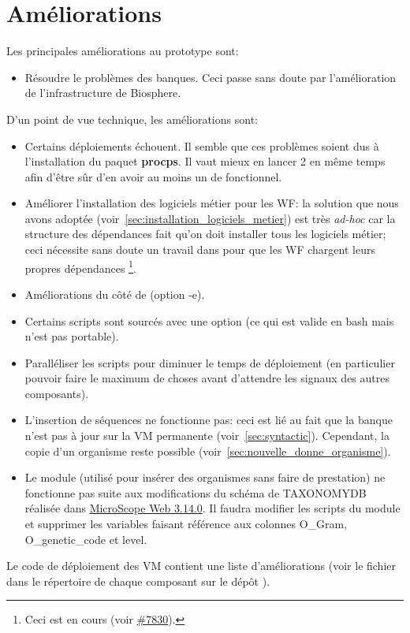 \section{Améliorations}

Les principales améliorations au prototype sont:
\begin{itemize}
    \item Résoudre le problèmes des banques.
          Ceci passe sans doute par l'amélioration de l'infrastructure de Biosphere.
\end{itemize}


D'un point de vue technique, les améliorations sont:
\begin{itemize}
    \item Certains déploiements échouent.
          Il semble que ces problèmes soient dus à l'installation du paquet \textbf{procps}.
          Il vaut mieux en lancer 2 en même temps afin d'être sûr d'en avoir au moins un de fonctionnel.
    \item Améliorer l'installation des logiciels métier pour les WF:
          la solution que nous avons adoptée (voir~\autoref{sec:installation_logiciels_metier}) est très \textit{ad-hoc}
          car la structure des dépendances fait qu'on doit installer tous les logiciels métier;
          ceci nécessite sans doute un travail dans  pour que les WF chargent leurs propres dépendances
          \footnote{Ceci est en cours (voir \href{https://intranet.genoscope.cns.fr/agc/redmine/issues/7830}{\#7830}).}.
    \item Améliorations du côté de  (option -e).
    \item Certains scripts sont sourcés avec une option (ce qui est valide en bash mais n'est pas portable).
    \item Paralléliser les scripts pour diminuer le temps de déploiement (en particulier pouvoir faire le maximum de choses avant d'attendre les signaux des autres composants).
    \item L'insertion de séquences ne fonctionne pas:
          ceci est lié au fait que la banque  n'est pas à jour sur la VM permanente (voir~\autoref{sec:syntactic}).
          Cependant, la copie d'un organisme reste possible (voir~\autoref{sec:nouvelle_donne_organisme}).
    \item Le module  (utilisé pour insérer des organismes sans faire de prestation)
          ne fonctionne pas suite aux modifications du schéma de TAXONOMYDB réalisée dans \href{https://intranet.genoscope.cns.fr/agc/redmine/versions/142}{MicroScope Web 3.14.0}.
          Il faudra modifier les scripts du module et supprimer les variables faisant référence aux colonnes O\_Gram, O\_genetic\_code et level.
\end{itemize}

Le code de déploiement des VM contient une liste d'améliorations (voir le fichier  dans le répertoire de chaque composant sur le dépôt ).
